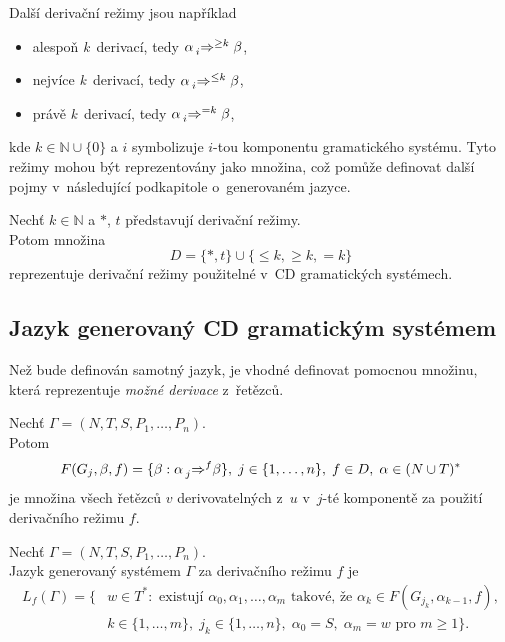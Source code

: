 Další derivační režimy jsou například
\begin{itemize}
    \item alespoň \emph{k}~derivací, tedy $\alpha \prescript{}{i}{\Rightarrow}^{\geq k}\; \beta$,
    \item nejvíce \emph{k}~derivací, tedy $\alpha \prescript{}{i}{\Rightarrow}^{\leq k}\; \beta$,
    \item právě \emph{k}~derivací, tedy $\alpha \prescript{}{i}{\Rightarrow}^{=k}\; \beta$,
\end{itemize}
kde $k \in \mathbb{N} \cup \{0\}$ a $i$ symbolizuje $i$-tou komponentu gramatického systému.
Tyto režimy mohou být reprezentovány jako množina, což pomůže definovat další pojmy v~následující podkapitole o~generovaném jazyce.
\begin{definition}\label{def_der_rezimy}
    Nechť $k\in \mathbb{N}$ a $*$, $t$ představují derivační režimy. \\
    Potom množina
    \begin{equation*}
        D = \{*, t\} \cup \{\leq k, \geq k, =k\}
    \end{equation*}        
    reprezentuje derivační režimy použitelné v~CD gramatických systémech.
\end{definition}

\subsection*{Jazyk generovaný CD gramatickým systémem}
Než bude definován samotný jazyk, je vhodné definovat pomocnou množinu, která reprezentuje \emph{možné derivace} z~řetězců.
\begin{definition}\label{def_mozne_derivace}
    Nechť $\Gamma = (N, T, S, P_1, \ldots, P_n)$. \\  
    Potom 
    \begin{equation*}
        F(G_j,\beta,f)=\{\beta : \alpha \prescript{}{j}{\Rightarrow^{f}}\beta\},\; j \in \{1, \ldots, n\},\; f\in D,\; \alpha \in (N \cup T)^{*}
    \end{equation*}        
    je množina všech řetězců $v$ derivovatelných z~$u$ v~$j$-té komponentě za použití derivačního režimu $f$.
\end{definition}

\begin{definition}\label{def_generovany_jazyk}
    Nechť $\Gamma = (N, T, S, P_1, \ldots, P_n)$. \\  
    Jazyk generovaný systémem $\Gamma$ za derivačního režimu $f$ je 
    \begin{align*}
         L_f(\Gamma) = \{&w \in T^*: \text{ existují } \alpha_0, \alpha_1,\ldots, \alpha_m \text{ takové, že } \alpha_k \in F(G_{j_{k}},\alpha_{k-1}, f),\\
         &k \in \{1, \ldots, m\},\;j_k \in \{1, \ldots, n\},\; \alpha_0 = S,\;\alpha_m = w \text{ pro } m \geq 1\}.
    \end{align*}        
\end{definition} 

